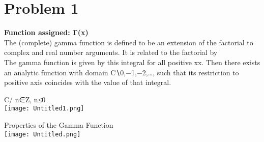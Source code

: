 \documentclass[12pt]{report}
\begin{document}
\section{Problem 1}
\textbf{Function assigned: Γ(x)}\\
The (complete) gamma function     is defined to be an extension of the factorial to complex and real number arguments. It is related to the factorial by\\



The gamma function is given by this integral for all positive xx. Then there exists an analytic function with domain C∖{0,−1,−2,…},  such that its restriction to positive axis coincides with the value of that integral. \\
\begin{center}
	C/{ n∈Z, n≤0}\\
\texttt{[image: Untitled1.png]}\\
\end{center}
Properties of the Gamma Function\\
   \texttt{[image: Untitled.png]}
 

   
















\newpage
\end{document}
